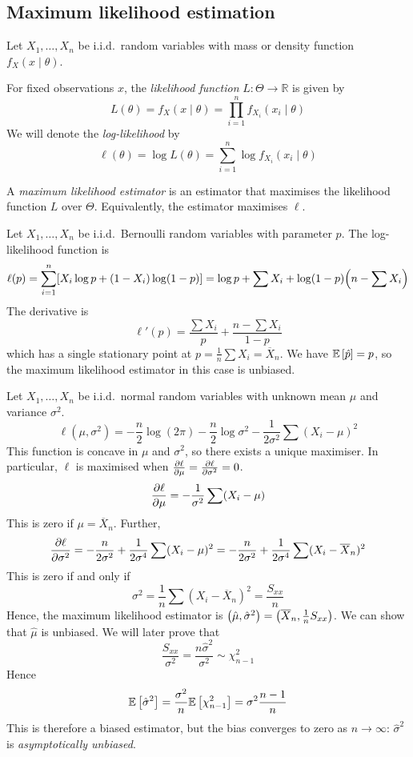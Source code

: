 \subsection{Maximum likelihood estimation}
Let \( X_1, \dots, X_n \) be i.i.d.\ random variables with mass or density function \( f_X(x \mid \theta) \).
\begin{definition}
	For fixed observations \( x \), the \textit{likelihood function} \( L \colon \Theta \to \mathbb R \) is given by
	\[
		L(\theta) = f_X(x \mid \theta) = \prod_{i=1}^n f_{X_i} (x_i \mid \theta)
	\]
	We will denote the \textit{log-likelihood} by
	\[
		\ell(\theta) = \log L(\theta) = \sum_{i=1}^n \log f_{X_i} (x_i \mid \theta)
	\]
\end{definition}
\begin{definition}
	A \textit{maximum likelihood estimator} is an estimator that maximises the likelihood function \( L \) over \( \Theta \).
	Equivalently, the estimator maximises \( \ell \).
\end{definition}
\begin{example}
	Let \( X_1, \dots, X_n \) be i.i.d.\ Bernoulli random variables with parameter \( p \).
	The log-likelihood function is
	\[
		\ell(p) = \sum_{i=1}^n [X_i \log p + (1-X_i) \log (1-p)] = \log p + \sum X_i + \log(1-p) \qty(n - \sum X_i)
	\]
	The derivative is
	\[
		\ell'(p) = \frac{\sum X_i}{p} + \frac{n - \sum X_i}{1-p}
	\]
	which has a single stationary point at \( p = \frac{1}{n} \sum X_i = \overline X_n \).
	We have \( \mathbb{E}\left[{\hat p}\right] = p \), so the maximum likelihood estimator in this case is unbiased.
\end{example}
\begin{example}
	Let \( X_1, \dots, X_n \) be i.i.d.\ normal random variables with unknown mean \( \mu \) and variance \( \sigma^2 \).
	\[
		\ell(\mu, \sigma^2) = -\frac{n}{2} \log(2\pi) - \frac{n}{2} \log \sigma^2 - \frac{1}{2\sigma^2} \sum (X_i - \mu)^2
	\]
	This function is concave in \( \mu \) and \( \sigma^2 \), so there exists a unique maximiser.
	In particular, \( \ell \) is maximised when \( \pdv{\ell}{\mu} = \pdv{\ell}{\sigma^2} = 0 \).
	\[
		\pdv{\ell}{\mu} = -\frac{1}{\sigma^2} \sum (X_i - \mu)
	\]
	This is zero if \( \mu = \overline X_n \).
	Further,
	\[
		\pdv{\ell}{\sigma^2} = -\frac{n}{2\sigma^2} + \frac{1}{2\sigma^4} \sum (X_i - \mu)^2 = -\frac{n}{2\sigma^2} + \frac{1}{2\sigma^4} \sum (X_i - \overline X_n)^2
	\]
	This is zero if and only if
	\[
		\sigma^2 = \frac{1}{n} \sum (X_i - \overline X_n)^2 = \frac{S_{xx}}{n}
	\]
	Hence, the maximum likelihood estimator is \( \qty(\hat \mu, \hat \sigma^2) = \qty(\overline X_n, \frac{1}{n} S_{xx}) \).
	We can show that \( \hat \mu \) is unbiased.
	We will later prove that
	\[
		\frac{S_{xx}}{\sigma^2} = \frac{n\hat \sigma^2}{\sigma^2} \sim \chi_{n-1}^2
	\]
	Hence
	\[
		\mathbb{E}\left[{\hat \sigma^2}\right] = \frac{\sigma^2}{n} \mathbb{E}\left[{\chi_{n-1}^2}\right] = \sigma^2 \frac{n-1}{n}
	\]
	This is therefore a biased estimator, but the bias converges to zero as \( n \to \infty \): \( \hat \sigma^2 \) is \textit{asymptotically unbiased}.
\end{example}
